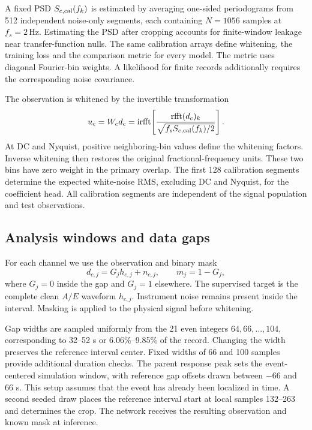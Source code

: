 \documentclass[10pt,prd,aps,a4paper,twocolumn,superscriptaddress,nofootinbib,floatfix]{revtex4-2}
\begin{document}
A fixed PSD $S_{c,\rm cal}(f_k)$ is estimated by averaging one-sided periodograms from 512 independent noise-only segments, each containing $N=1056$ samples at $f_s=2\,\mathrm{Hz}$. Estimating the PSD after cropping accounts for finite-window leakage near transfer-function nulls. The same calibration arrays define whitening, the training loss and the comparison metric for every model. The metric uses diagonal Fourier-bin weights. A likelihood for finite records additionally requires the corresponding noise covariance.

The observation is whitened by the invertible transformation
\begin{equation}
u_c=W_cd_c=\operatorname{irfft}\!\left[
\frac{\operatorname{rfft}(d_c)_k}{\sqrt{f_sS_{c,\rm cal}(f_k)/2}}\right].\label{eq:whitening}
\end{equation}
At DC and Nyquist, positive neighboring-bin values define the whitening factors. Inverse whitening then restores the original fractional-frequency units. These two bins have zero weight in the primary overlap. The first 128 calibration segments determine the expected white-noise RMS, excluding DC and Nyquist, for the coefficient head. All calibration segments are independent of the signal population and test observations.

\subsection{Analysis windows and data gaps}\label{sec:gaps}
For each channel we use the observation and binary mask
\begin{equation}
d_{c,j}=G_jh_{c,j}+n_{c,j},\qquad m_j=1-G_j,\label{eq:observation}
\end{equation}
where $G_j=0$ inside the gap and $G_j=1$ elsewhere. The supervised target is the complete clean $A/E$ waveform $h_{c,j}$. Instrument noise remains present inside the interval. Masking is applied to the physical signal before whitening.

Gap widths are sampled uniformly from the 21 even integers $64,66,\ldots,104$, corresponding to 32--52 s or 6.06\%--9.85\% of the record. Changing the width preserves the reference interval center. Fixed widths of 66 and 100 samples provide additional duration checks. The parent response peak sets the event-centered simulation window, with reference gap offsets drawn between $-66$ and $66$ s. This setup assumes that the event has already been localized in time. A second seeded draw places the reference interval start at local samples 132--263 and determines the crop. The network receives the resulting observation and known mask at inference.
\end{document}

